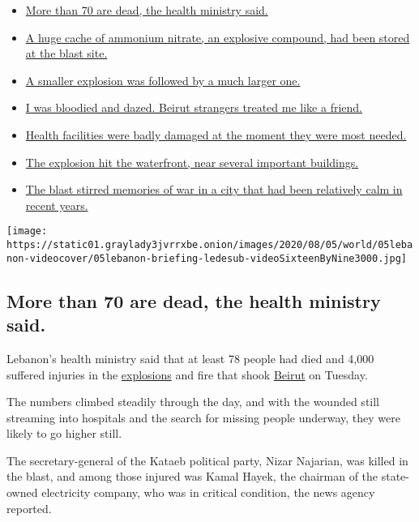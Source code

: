\begin{itemize}
\tightlist
\item
  \protect\hyperlink{link-2e7a9219}{More than 70 are dead, the health
  ministry said.}
\item
  \protect\hyperlink{link-1971293e}{A huge cache of ammonium nitrate, an
  explosive compound, had been stored at the blast site.}
\item
  \protect\hyperlink{link-12ef1c10}{A smaller explosion was followed by
  a much larger one.}
\item
  \protect\hyperlink{link-1fdae9ed}{I was bloodied and dazed. Beirut
  strangers treated me like a friend.}
\item
  \protect\hyperlink{link-777231d6}{Health facilities were badly damaged
  at the moment they were most needed.}
\item
  \protect\hyperlink{link-1202af77}{The explosion hit the waterfront,
  near several important buildings.}
\item
  \protect\hyperlink{link-3a2e264f}{The blast stirred memories of war in
  a city that had been relatively calm in recent years.}
\end{itemize}

\texttt{[image: https://static01.graylady3jvrrxbe.onion/images/2020/08/05/world/05lebanon-videocover/05lebanon-briefing-ledesub-videoSixteenByNine3000.jpg]}

\hypertarget{more-than-70-are-dead-the-health-ministry-said}{%
\subsection{More than 70 are dead, the health ministry
said.}\label{more-than-70-are-dead-the-health-ministry-said}}

Lebanon's health ministry said that at least 78 people had died and
4,000 suffered injuries in the
\href{https://www.nytimes3xbfgragh.onion/2020/08/04/world/middleeast/lebanon-explosion-beirut.html}{explosions}
and fire that shook
\href{https://www.nytimes3xbfgragh.onion/2020/08/04/world/middleeast/lebanon-explosion-beirut.html}{Beirut}
on Tuesday.

The numbers climbed steadily through the day, and with the wounded still
streaming into hospitals and the search for missing people underway,
they were likely to go higher still.

The secretary-general of the Kataeb political party, Nizar Najarian, was
killed in the blast, and among those injured was Kamal Hayek, the
chairman of the state-owned electricity company, who was in critical
condition, the news agency reported.


